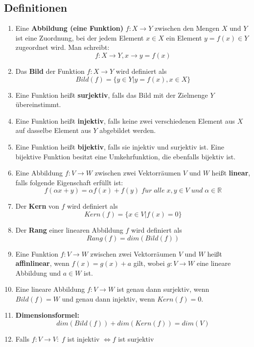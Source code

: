 \documentclass[a4paper,twocolumn,10pt]{article}
\begin{document}
\subsection{Definitionen}
\begin{enumerate}[label=$\bullet$]
\item Eine \textbf{Abbildung (eine Funktion)} $f:X\rightarrow Y$ zwischen den Mengen $X$ und $Y$ ist eine Zuordnung, bei der jedem Element $x\in X$ ein Element $y =f(x)\in Y$ zugeordnet wird. Man schreibt:
\begin{equation*}
f:X\rightarrow Y, x\rightarrow y = f(x)
\end{equation*}
\item Das \textbf{Bild} der Funktion $f:X\rightarrow Y$ wird definiert als
\begin{equation*}
Bild(f)=\{y\in Y|y=f(x),x\in X\}
\end{equation*}
\item Eine Funktion heißt \textbf{surjektiv}, falls das Bild mit der Zielmenge $Y$ übereinstimmt.
\item Eine Funktion heißt \textbf{injektiv}, falls keine zwei verschiedenen Element aus $X$ auf dasselbe Element aus $Y$ abgebildet werden.
\item Eine Funktion heißt \textbf{bijektiv}, falls sie injektiv und surjektiv ist. Eine bijektive Funktion besitzt eine Umkehrfunktion, die ebenfalls bijektiv ist.
\item Eine Abbildung $f:V\rightarrow W$ zwischen zwei Vektorräumen $V$ und $W$ heißt \textbf{linear}, falls folgende Eigenschaft erfüllt ist:
\begin{equation*}
f(\alpha x+y)=\alpha f(x)+f(y)\;f\ddot{u}r\;alle\;x,y\in V\;und\;\alpha\in\mathbb{R}
\end{equation*}
\item Der \textbf{Kern} von $f$ wird definiert als
\begin{equation*}
Kern(f)=\{x\in V|f(x)=0\}
\end{equation*}
\item Der \textbf{Rang} einer linearen Abbildung $f$ wird definiert als
\begin{equation*}
Rang(f)=dim(Bild(f))
\end{equation*}
\item Eine Funktion $f:V\rightarrow W$ zwischen zwei Vektorräumen $V$ und $W$ heißt \textbf{affinlinear}, wenn $f(x)=g(x)+a$ gilt, wobei $g:V\rightarrow W$ eine lineare Abbildung und $a\in W$ ist.
\item Eine lineare Abbildung $f:V\rightarrow W$ ist genau dann surjektiv, wenn $Bild(f)=W$ und genau dann injektiv, wenn $Kern(f)=0$.
\item \textbf{Dimensionsformel:}
\begin{equation*}
dim(Bild(f))+dim(Kern(f))=dim(V)
\end{equation*}
\item Falls $f:V\rightarrow V:\;f$ ist injektiv $\Leftrightarrow f$ ist surjektiv
\end{enumerate}
\end{document}
